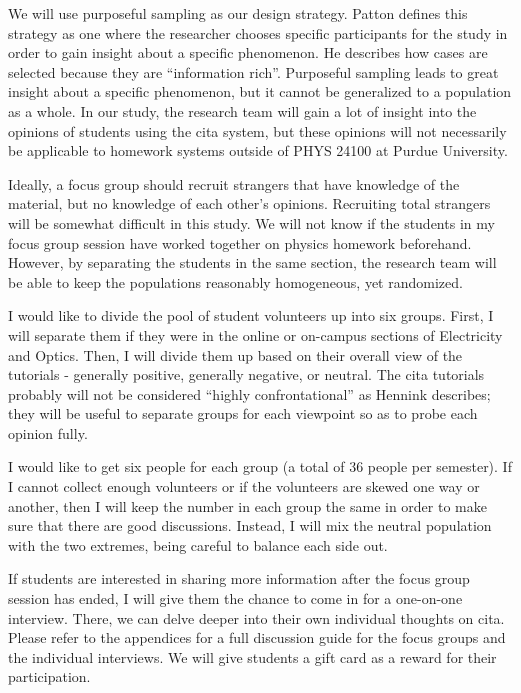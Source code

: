 We will use purposeful sampling as our design strategy. Patton defines this strategy as one where the researcher chooses specific participants for the study in order to gain insight about a specific phenomenon. He describes how cases are selected because they are ``information rich''. Purposeful sampling leads to great insight about a specific phenomenon, but it cannot be generalized to a population as a whole\cite{patton2015}. In our study, the research team will gain a lot of insight into the opinions of students using the \gls{cita} system, but these opinions will not necessarily be applicable to homework systems outside of PHYS 24100 at Purdue University.

Ideally, a focus group should recruit strangers that have knowledge of the material, but no knowledge of each other's opinions\cite{hennink2014}. Recruiting total strangers will be somewhat difficult in this study. We will not know if the students in my focus group session have worked together on physics homework beforehand. However, by separating the students in the same section, the research team will be able to keep the populations reasonably homogeneous, yet randomized.

I would like to divide the pool of student volunteers up into six groups. First, I will separate them if they were in the online or on-campus sections of Electricity and Optics. Then, I will divide them up based on their overall view of the tutorials - generally positive, generally negative, or neutral. The \gls{cita} tutorials probably will not be considered ``highly confrontational'' as Hennink describes; they will be useful to separate groups for each viewpoint so as to probe each opinion fully.

I would like to get six people for each group (a total of 36 people per semester). If I cannot collect enough volunteers or if the volunteers are skewed one way or another, then I will keep the number in each group the same in order to make sure that there are good discussions. Instead, I will mix the neutral population with the two extremes, being careful to balance each side out.

If students are interested in sharing more information after the focus group session has ended, I will give them the chance to come in for a one-on-one interview. There, we can delve deeper into their own individual thoughts on \gls{cita}. Please refer to the appendices for a full discussion guide for the focus groups and the individual interviews. We will give students a gift card as a reward for their participation.

